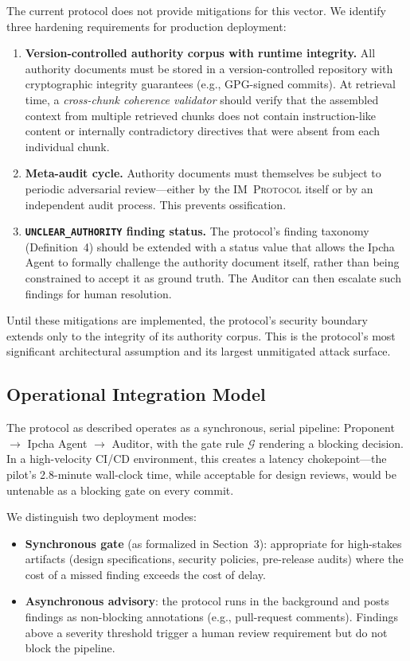 \documentclass[11pt,a4paper]{article}
\newcommand{\protshort}{\textsc{IM~Protocol}}
\begin{document}
The current protocol does not provide mitigations for this vector.
We identify three hardening requirements for production deployment:
\begin{enumerate}
  \item \textbf{Version-controlled authority corpus with runtime integrity.} All authority documents must be stored in a version-controlled repository with cryptographic integrity guarantees (e.g., GPG-signed commits).
  At retrieval time, a \emph{cross-chunk coherence validator} should verify that the assembled context from multiple retrieved chunks does not contain instruction-like content or internally contradictory directives that were absent from each individual chunk.
  \item \textbf{Meta-audit cycle.} Authority documents must themselves be subject to periodic adversarial review---either by the \protshort{} itself or by an independent audit process. This prevents ossification.
  \item \textbf{\texttt{UNCLEAR\_AUTHORITY} finding status.} The protocol's finding taxonomy (Definition~4) should be extended with a status value that allows the Ipcha Agent to formally challenge the authority document itself, rather than being constrained to accept it as ground truth. The Auditor can then escalate such findings for human resolution.
\end{enumerate}
Until these mitigations are implemented, the protocol's security boundary extends only to the integrity of its authority corpus.
This is the protocol's most significant architectural assumption and its largest unmitigated attack surface.

\subsection{Operational Integration Model}
\label{sec:operational}
The protocol as described operates as a synchronous, serial pipeline: Proponent $\to$ Ipcha Agent $\to$ Auditor, with the gate rule $\mathcal{G}$ rendering a blocking decision.
In a high-velocity CI/CD environment, this creates a latency chokepoint---the pilot's 2.8-minute wall-clock time, while acceptable for design reviews, would be untenable as a blocking gate on every commit.

We distinguish two deployment modes:
\begin{itemize}
  \item \textbf{Synchronous gate} (as formalized in Section~3): appropriate for high-stakes artifacts (design specifications, security policies, pre-release audits) where the cost of a missed finding exceeds the cost of delay.
  \item \textbf{Asynchronous advisory}: the protocol runs in the background and posts findings as non-blocking annotations (e.g., pull-request comments). Findings above a severity threshold trigger a human review requirement but do not block the pipeline.
\end{itemize}
\end{document}
